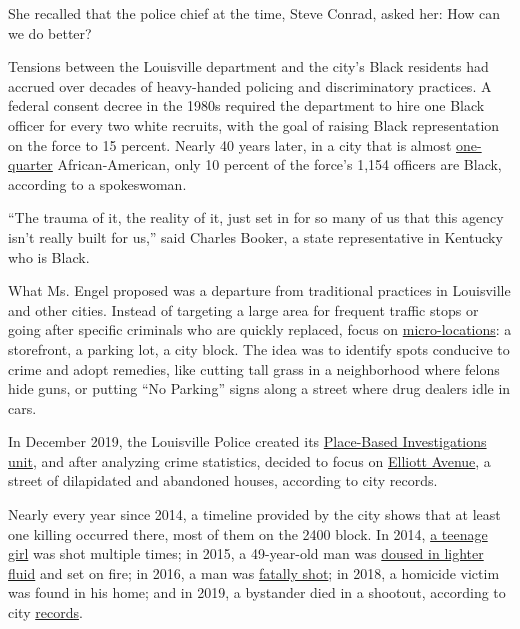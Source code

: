 She recalled that the police chief at the time, Steve Conrad, asked her:
How can we do better?

Tensions between the Louisville department and the city's Black
residents had accrued over decades of heavy-handed policing and
discriminatory practices. A federal consent decree in the 1980s required
the department to hire one Black officer for every two white recruits,
with the goal of raising Black representation on the force to 15
percent. Nearly 40 years later, in a city that is almost
\href{https://www.census.gov/quickfacts/louisvillejeffersoncountybalancekentucky}{one-quarter}
African-American, only 10 percent of the force's 1,154 officers are
Black, according to a spokeswoman.

``The trauma of it, the reality of it, just set in for so many of us
that this agency isn't really built for us,'' said Charles Booker, a
state representative in Kentucky who is Black.

What Ms. Engel proposed was a departure from traditional practices in
Louisville and other cities. Instead of targeting a large area for
frequent traffic stops or going after specific criminals who are quickly
replaced, focus on
\href{https://www.theiacp.org/sites/default/files/Research\%20Center/RIB-Place-Based-Investigations-to-Disrupt-Crime-Place-Networks\%20(1)\%20(1).pdf}{micro-locations}:
a storefront, a parking lot, a city block. The idea was to identify
spots conducive to crime and adopt remedies, like cutting tall grass in
a neighborhood where felons hide guns, or putting ``No Parking'' signs
along a street where drug dealers idle in cars.

In December 2019, the Louisville Police created its
\href{https://louisville-police.org/Directory.aspx?did=65}{Place-Based
Investigations unit}, and after analyzing crime statistics, decided to
focus on
\href{https://louisvilleky.gov/sites/default/files/mayors_office/news_images/elliott_ave_project_timeline_2020.pdf}{Elliott
Avenue}, a street of dilapidated and abandoned houses, according to city
records.

Nearly every year since 2014, a timeline provided by the city shows that
at least one killing occurred there, most of them on the 2400 block. In
2014,
\href{https://www.wdrb.com/news/teenage-girl-shot-to-death-in-russell-neighborhood/article_f6f75191-dd9e-531c-afb3-a93f4a88a605.html}{a
teenage girl} was shot multiple times; in 2015, a 49-year-old man was
\href{https://www.wdrb.com/news/police-arrest-suspect-after-man-found-engulfed-in-flames/article_c5437513-0000-59b9-a5f1-ead248db4200.html}{doused
in lighter fluid} and set on fire; in 2016, a man was
\href{https://www.wdrb.com/news/crime-reports/lmpd-investigating-fatal-shooting-in-russell-neighborhood/article_097d3cd6-24e9-5038-be8b-80de9425fdb7.html}{fatally
shot}; in 2018, a homicide victim was found in his home; and in 2019, a
bystander died in a shootout, according to city
\href{https://louisvilleky.gov/sites/default/files/mayors_office/news_images/elliott_ave_project_timeline_2020.pdf}{records}.

